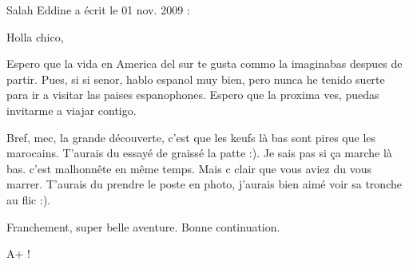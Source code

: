 \medskip
Salah Eddine a écrit le 01 nov. 2009 :
\begin{displayquote}
Holla chico,

Espero que la vida en America del sur te gusta commo la imaginabas despues de partir. Pues, si si senor, hablo espanol muy bien, pero nunca he tenido suerte para ir a visitar las paises espanophones. Espero que la proxima ves, puedas invitarme a viajar contigo.

Bref, mec, la grande découverte, c'est que les keufs là bas sont pires que les marocains. T'aurais du essayé de graissé la patte :). Je sais pas si ça marche là bas. c'est malhonnête en même temps. Mais c clair que vous aviez du vous marrer. T'aurais du prendre le poste en photo, j'aurais bien aimé voir sa tronche au flic :).

Franchement, super belle aventure. Bonne continuation.

A+ !
\end{displayquote}

